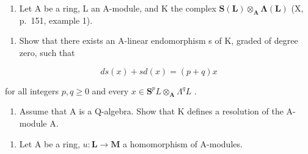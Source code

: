 
\begin{enumerate}
\def\labelenumi{\arabic{enumi})}
\tightlist
\item
  Let A be a ring, L an A-module, and K the complex \(\mathbf{S}(\mathbf{L})\otimes_{\mathbf{A}}\symbf{\Lambda}(\mathbf{L})\) (X, p.~151, example 1).
\end{enumerate}

\begin{enumerate}
\def\labelenumi{\alph{enumi})}
\tightlist
\item
  Show that there exists an A-linear endomorphism s of K, graded of degree zero, such that
\end{enumerate}

\[
d s (x) + s d (x) = (p + q) x
\]

for all integers \(p, q \geqslant 0\) and every \(x \in \mathbf{S}^p L \otimes_{\mathbf{A}} \Lambda^q L\) .

\begin{enumerate}
\def\labelenumi{\alph{enumi})}
\setcounter{enumi}{1}
\tightlist
\item
  Assume that A is a Q-algebra. Show that K defines a resolution of the A-module A.
\end{enumerate}

\begin{enumerate}
\def\labelenumi{\arabic{enumi})}
\setcounter{enumi}{1}
\tightlist
\item
  Let A be a ring, \(u: \mathbf{L} \to \mathbf{M}\) a homomorphism of A-modules.
\end{enumerate}

